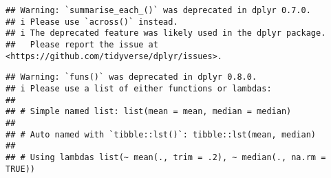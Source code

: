 \documentclass[
]{article}
\newenvironment{Shaded}{\begin{snugshade}}{\end{snugshade}}
\newcommand{\AttributeTok}[1]{\textcolor[rgb]{0.77,0.63,0.00}{#1}}
\newcommand{\CommentTok}[1]{\textcolor[rgb]{0.56,0.35,0.01}{\textit{#1}}}
\newcommand{\ConstantTok}[1]{\textcolor[rgb]{0.00,0.00,0.00}{#1}}
\newcommand{\DecValTok}[1]{\textcolor[rgb]{0.00,0.00,0.81}{#1}}
\newcommand{\DocumentationTok}[1]{\textcolor[rgb]{0.56,0.35,0.01}{\textbf{\textit{#1}}}}
\newcommand{\FunctionTok}[1]{\textcolor[rgb]{0.00,0.00,0.00}{#1}}
\newcommand{\NormalTok}[1]{#1}
\newcommand{\OtherTok}[1]{\textcolor[rgb]{0.56,0.35,0.01}{#1}}
\newcommand{\SpecialCharTok}[1]{\textcolor[rgb]{0.00,0.00,0.00}{#1}}
\begin{document}
\begin{Shaded}
\end{Shaded}

\begin{verbatim}
## Warning: `summarise_each_()` was deprecated in dplyr 0.7.0.
## i Please use `across()` instead.
## i The deprecated feature was likely used in the dplyr package.
##   Please report the issue at <https://github.com/tidyverse/dplyr/issues>.
\end{verbatim}

\begin{verbatim}
## Warning: `funs()` was deprecated in dplyr 0.8.0.
## i Please use a list of either functions or lambdas:
## 
## # Simple named list: list(mean = mean, median = median)
## 
## # Auto named with `tibble::lst()`: tibble::lst(mean, median)
## 
## # Using lambdas list(~ mean(., trim = .2), ~ median(., na.rm = TRUE))
\end{verbatim}
\end{document}
